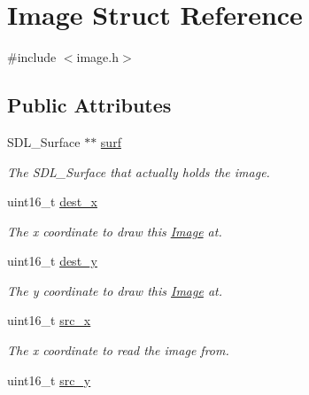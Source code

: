 \hypertarget{structImage}{}\section{Image Struct Reference}
\label{structImage}


{\ttfamily \#include $<$image.\+h$>$}

\subsection*{Public Attributes}
\begin{DoxyCompactItemize}
\item 
S\+D\+L\+\_\+\+Surface $\ast$$\ast$ \hyperlink{structImage_a2c427d5e65ecf2993bbfd9e9eb97f574}{surf}\hypertarget{structImage_a2c427d5e65ecf2993bbfd9e9eb97f574}{}\label{structImage_a2c427d5e65ecf2993bbfd9e9eb97f574}

\begin{DoxyCompactList}\small\item\em The S\+D\+L\+\_\+\+Surface that actually holds the image. \end{DoxyCompactList}\item 
uint16\+\_\+t \hyperlink{structImage_a77bce3fa35e0a72809d45ca19aa2459c}{dest\+\_\+x}\hypertarget{structImage_a77bce3fa35e0a72809d45ca19aa2459c}{}\label{structImage_a77bce3fa35e0a72809d45ca19aa2459c}

\begin{DoxyCompactList}\small\item\em The x coordinate to draw this \hyperlink{structImage}{Image} at. \end{DoxyCompactList}\item 
uint16\+\_\+t \hyperlink{structImage_a780b789cd1e8241ca752ed6552db0497}{dest\+\_\+y}\hypertarget{structImage_a780b789cd1e8241ca752ed6552db0497}{}\label{structImage_a780b789cd1e8241ca752ed6552db0497}

\begin{DoxyCompactList}\small\item\em The y coordinate to draw this \hyperlink{structImage}{Image} at. \end{DoxyCompactList}\item 
uint16\+\_\+t \hyperlink{structImage_a7b776d63410ee789b118d89f08d5944d}{src\+\_\+x}\hypertarget{structImage_a7b776d63410ee789b118d89f08d5944d}{}\label{structImage_a7b776d63410ee789b118d89f08d5944d}

\begin{DoxyCompactList}\small\item\em The x coordinate to read the image from. \end{DoxyCompactList}\item 
uint16\+\_\+t \hyperlink{structImage_a6cff91a28fd6fc62d9ebc781e0a10676}{src\+\_\+y}\hypertarget{structImage_a6cff91a28fd6fc62d9ebc781e0a10676}{}\label{structImage_a6cff91a28fd6fc62d9ebc781e0a10676}


\end{DoxyCompactItemize}
